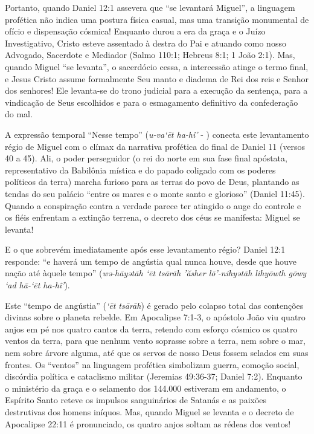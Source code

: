 \documentclass[11pt,a4paper,openany]{book}
\begin{document}
Portanto, quando Daniel 12:1 assevera que ``se levantará Miguel'', a linguagem profética não indica uma postura física casual, mas uma transição monumental de ofício e dispensação cósmica! Enquanto durou a era da graça e o Juízo Investigativo, Cristo esteve assentado à destra do Pai e atuando como nosso Advogado, Sacerdote e Mediador (Salmo 110:1; Hebreus 8:1; 1 João 2:1). Mas, quando Miguel ``se levanta'', o sacerdócio cessa, a intercessão atinge o termo final, e Jesus Cristo assume formalmente Seu manto e diadema de Rei dos reis e Senhor dos senhores! Ele levanta-se do trono judicial para a execução da sentença, para a vindicação de Seus escolhidos e para o esmagamento definitivo da confederação do mal.

A expressão temporal ``Nesse tempo'' (\textit{u-va‘ēt ha-hî’} - ) conecta este levantamento régio de Miguel com o clímax da narrativa profética do final de Daniel 11 (versos 40 a 45). Ali, o poder perseguidor (o rei do norte em sua fase final apóstata, representativo da Babilônia mística e do papado coligado com os poderes políticos da terra) marcha furioso para as terras do povo de Deus, plantando as tendas do seu palácio ``entre os mares e o monte santo e glorioso'' (Daniel 11:45). Quando a conspiração contra a verdade parece ter atingido o auge do controle e os fiéis enfrentam a extinção terrena, o decreto dos céus se manifesta: Miguel se levanta!

E o que sobrevém imediatamente após esse levantamento régio? Daniel 12:1 responde: ``e haverá um tempo de angústia qual nunca houve, desde que houve nação até àquele tempo'' (\textit{wə-hāyətāh ‘ēt tsārāh ’ăsher lō’-nihyətāh lihyōwth gōwy ‘ad hā-‘ēt ha-hî’}).

Este ``tempo de angústia'' (\textit{‘ēt tsārāh}) é gerado pelo colapso total das contenções divinas sobre o planeta rebelde. Em Apocalipse 7:1-3, o apóstolo João viu quatro anjos em pé nos quatro cantos da terra, retendo com esforço cósmico os quatro ventos da terra, para que nenhum vento soprasse sobre a terra, nem sobre o mar, nem sobre árvore alguma, até que os servos de nosso Deus fossem selados em suas frontes. Os ``ventos'' na linguagem profética simbolizam guerra, comoção social, discórdia política e cataclismo militar (Jeremias 49:36-37; Daniel 7:2). Enquanto o ministério da graça e o selamento dos 144.000 estiveram em andamento, o Espírito Santo reteve os impulsos sanguinários de Satanás e as paixões destrutivas dos homens iníquos. Mas, quando Miguel se levanta e o decreto de Apocalipse 22:11 é pronunciado, os quatro anjos soltam as rédeas dos ventos!
\end{document}
